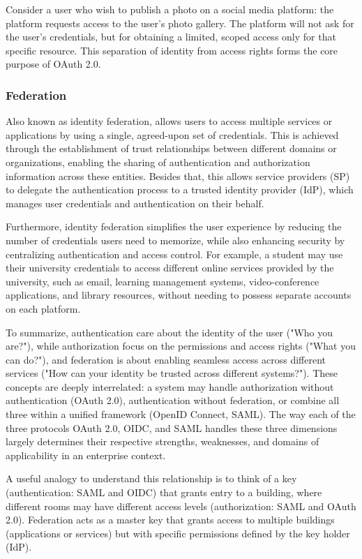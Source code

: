 \documentclass[../memoire.tex]{subfiles}
\begin{document}
Consider a user who wish to publish a photo on a social media platform: the platform requests access to the user's photo gallery. The platform will not ask for the user's credentials, but for obtaining a limited, scoped access only for that specific resource. This separation of identity from access rights forms the core purpose of OAuth 2.0.

\subsubsection{Federation}

Also known as identity federation, allows users to access multiple services or applications by using a single, agreed-upon set of credentials\cite[p.~134]{wilson2022}. This is achieved through the establishment of trust relationships between different domains or organizations, enabling the sharing of authentication and authorization information across these entities. Besides that, this allows service providers (SP) to delegate the authentication process to a trusted identity provider (IdP), which manages user credentials and authentication on their behalf.

Furthermore, identity federation simplifies the user experience by reducing the number of credentials users need to memorize, while also enhancing security by centralizing authentication and access control. For example, a student may use their university credentials to access different online services provided by the university, such as email, learning management systems, video-conference applications, and library resources, without needing to possess separate accounts on each platform. 

To summarize, authentication care about the identity of the user ("Who you are?"), while authorization focus on the permissions and access rights ("What you can do?"), and federation is about enabling seamless access across different services ("How can your identity be trusted across different systems?"). These concepts are deeply interrelated: a system may handle authorization without authentication (OAuth 2.0), authentication without federation, or combine all three within a unified framework (OpenID Connect, SAML). The way each of the three protocols OAuth 2.0, OIDC, and SAML handles these three dimensions largely determines their respective strengths, weaknesses, and domains of applicability in an enterprise context.

A useful analogy to understand this relationship is to think of a key (authentication: SAML and OIDC) that grants entry to a building, where different rooms may have different access levels (authorization: SAML and OAuth 2.0). Federation acts as a master key that grants access to multiple buildings (applications or services) but with specific permissions defined by the key holder (IdP). 
\end{document}
